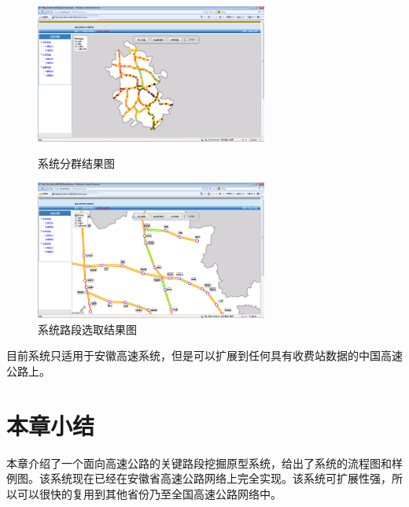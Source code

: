 				\begin{figure}[h]
				\begin{minipage}{0.5\linewidth}
					\centering
					\includegraphics[width=3.0in]{picture/yuanxing1}
					\caption{系统分群结果图}
					\label{fig21}
				\end{minipage}%
				\begin{minipage}{0.5\linewidth}
					\centering
					\includegraphics[width=3.0in]{picture/yuanxing2}
					\caption{系统路段选取结果图}
					\label{fig22}
				\end{minipage}
				\end{figure}



		目前系统只适用于安徽高速系统，但是可以扩展到任何具有收费站数据的中国高速公路上。

	\section{本章小结}
		本章介绍了一个面向高速公路的关键路段挖掘原型系统，给出了系统的流程图和样例图。该系统现在已经在安徽省高速公路网络上完全实现。该系统可扩展性强，所以可以很快的复用到其他省份乃至全国高速公路网络中。

	